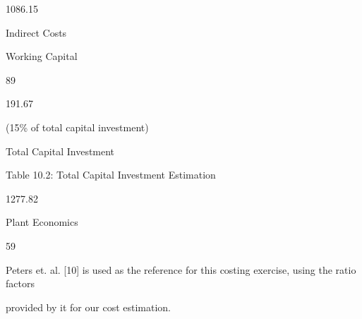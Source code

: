 \documentclass[a4paper,portrait,12pt]{article}
\begin{document}
1086.15





\begin{flushleft}
Indirect Costs
\end{flushleft}





\begin{flushleft}
Working Capital
\end{flushleft}





89





191.67





\begin{flushleft}
(15\% of total capital investment)
\end{flushleft}





\begin{flushleft}
Total Capital Investment
\end{flushleft}


\begin{flushleft}
Table 10.2: Total Capital Investment Estimation
\end{flushleft}





1277.82





\begin{flushleft}
\newpage
Plant Economics
\end{flushleft}





59





\begin{flushleft}
Peters et. al. [10] is used as the reference for this costing exercise, using the ratio factors
\end{flushleft}


\begin{flushleft}
provided by it for our cost estimation.
\end{flushleft}
\end{document}
